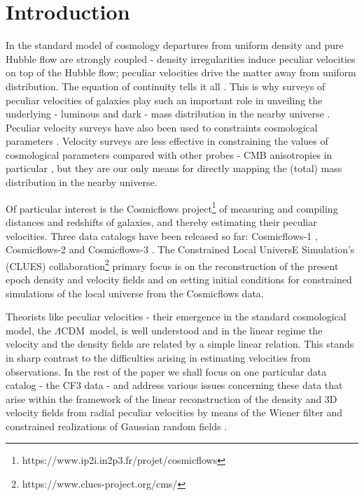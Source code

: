 \documentclass[useAMS,usenatbib]{mn2e}
\newcommand{\LCDM}{{$\Lambda$CDM}}
\begin{document}
\section{Introduction}


In the standard model of cosmology departures from uniform density and pure Hubble flow are strongly coupled - density irregularities induce peculiar velocities on top of the Hubble flow; peculiar  velocities   drive  the matter away from uniform distribution. The equation of continuity tells it all  \citep{1980lssu.book.....P,2008cosm.book.....W}.  This is why surveys of peculiar velocities of galaxies  play such  an important  role in unveiling   the  underlying - luminous and dark - mass  distribution  in  the  nearby universe  
\citep[][is only a partial list]{1986ApJ...307...91L,1988ApJ...326...19L,1990ApJ...364..349D,1996ApJ...468L...5D,2006ApJ...653..861M}. 
Peculiar velocity surveys have also been used to constraints   cosmological parameters 
\citep[e.g.][]{1993ApJ...412....1D,2001MNRAS.326..375Z,2011ApJ...736...93N,2017MNRAS.470..445N,2018MNRAS.481.1368P}.
Velocity surveys are less effective in constraining  the values of cosmological parameters compared with other probes - CMB  anisotropies in particular  \citep[e.g.][]{Planck:2013}, but they are our only means  for directly mapping the (total) mass distribution  in the nearby universe.

Of particular interest   is the Cosmicflows project\footnote{https://www.ip2i.in2p3.fr/projet/cosmicflows} of measuring and compiling distances and redshifts of galaxies,  and thereby estimating their peculiar velocities. Three data catalogs have been  released so far:  Cosmicflows-1   \citep{2008ApJ...676..184T}, Cosmicflows-2  \citep{2013AJ....146...86T} and Cosmicflows-3 \citep[hereafter CF3]{2013AJ....146...86T}. The Constrained Local UniversE Simulation's (CLUES) collaboration\footnote{https://www.clues-project.org/cms/} primary focus  is on   the reconstruction of the present epoch  density  and velocity  fields 
\citep[e.g.][]{2012ApJ...744...43C,2013AJ....146...69C,
2014Natur.513...71T,
2017NatAs...1E..36H,
2017ApJ...845...55P,
2020ApJ...897..133P}
and on setting  initial conditions for constrained simulations of the local universe
\citep[e.g.][]{2008MNRAS.386..390H,
2011MNRAS.417.1434F,
2014NewAR..58....1Y,
2016MNRAS.455.2078S,
2018NatAs...2..680H,
2020MNRAS.496.4087O,2020MNRAS.498.2968L}
from the Cosmicflows data.

Theorists like peculiar velocities  -  their emergence in the standard  cosmological model, the \LCDM\ model, is well understood and in the linear regime the velocity and the density fields are related by a simple linear relation. This stands in sharp contrast to the difficulties arising in estimating  velocities  from observations.  In the rest of the paper we shall focus on one particular data catalog - the CF3 data - and address various  issues  concerning  these data that arise  within the framework of the linear reconstruction of the density  and 3D velocity fields from radial peculiar velocities by means of the Wiener filter and constrained realizations  of Gaussian random fields  \citep[WF/CRs;][]{1991ApJ...380L...5H,1995ApJ...449..446Z,1999ApJ...520..413Z}.
\end{document}
